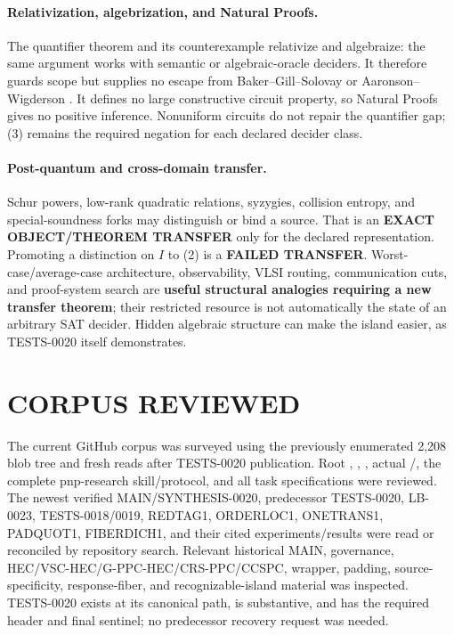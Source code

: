 \documentclass[11pt]{article}
\begin{document}
\paragraph{Relativization, algebrization, and Natural Proofs.}
The quantifier theorem and its counterexample relativize and algebraize: the
same argument works with semantic or algebraic-oracle deciders.  It therefore
guards scope but supplies no escape from Baker--Gill--Solovay or
Aaronson--Wigderson \cite{BGS75,AW09}.  It defines no large constructive
circuit property, so Natural Proofs gives no positive inference.  Nonuniform
circuits do not repair the quantifier gap; (3) remains the required negation
for each declared decider class.

\paragraph{Post-quantum and cross-domain transfer.}
Schur powers, low-rank quadratic relations, syzygies, collision entropy, and
special-soundness forks may distinguish or bind a source.  That is an
\textbf{EXACT OBJECT/THEOREM TRANSFER} only for the declared representation.
Promoting a distinction on $I$ to (2) is a \textbf{FAILED TRANSFER}.
Worst-case/average-case architecture, observability, VLSI routing,
communication cuts, and proof-system search are \textbf{useful structural
analogies requiring a new transfer theorem}; their restricted resource is not
automatically the state of an arbitrary SAT decider.  Hidden algebraic
structure can make the island easier, as TESTS-0020 itself demonstrates.

\section{CORPUS REVIEWED}

The current GitHub corpus was surveyed using the previously enumerated 2,208
blob tree and fresh reads after TESTS-0020 publication.  Root
, , , actual
/, the complete pnp-research skill/protocol,
and all task specifications were reviewed.  The newest verified
MAIN/SYNTHESIS-0020, predecessor TESTS-0020, LB-0023, TESTS-0018/0019,
REDTAG1, ORDERLOC1, ONETRANS1, PADQUOT1, FIBERDICH1, and their cited
experiments/results were read or reconciled by repository search.  Relevant
historical MAIN, governance, HEC/VSC-HEC/G-PPC-HEC/CRS-PPC/CCSPC, wrapper,
padding, source-specificity, response-fiber, and recognizable-island material
was inspected.  TESTS-0020 exists at its canonical path, is substantive, and
has the required header and final sentinel; no predecessor recovery request
was needed.
\end{document}
